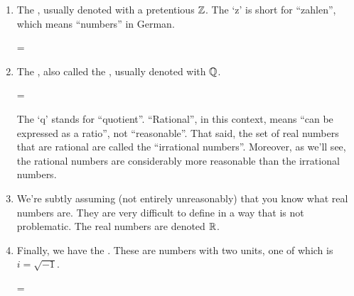 \begin{enumerate}
\item The , usually denoted with a pretentious
  $\mathbb{Z}$. The `z' is short for ``zahlen'', which means ``numbers'' in
  German. \cite{w-integers}

  \begin{zz}
    \Z = 
  \end{zz}
\item The , also called the , usually denoted with $\mathbb{Q}$.

  \begin{zz}
    \Q = 
  \end{zz}

  The `q' stands for ``quotient''. ``Rational'', in this context,
  means ``can be expressed as a ratio'', not ``reasonable''. That
  said, the set of real numbers that are  rational are called
  the ``irrational numbers''. Moreover, as we'll see, the rational
  numbers are considerably more reasonable than the irrational
  numbers.
\item We're subtly assuming (not entirely unreasonably) that you know
  what real numbers are. They are very difficult to define in a way
  that is not problematic. The real numbers are denoted $\mathbb{R}$. 
\item Finally, we have the . These are numbers
  with two units, one of which is $i = \sqrt{-1}$.

  \begin{zz}
    \C = 
  \end{zz}
\end{enumerate}

